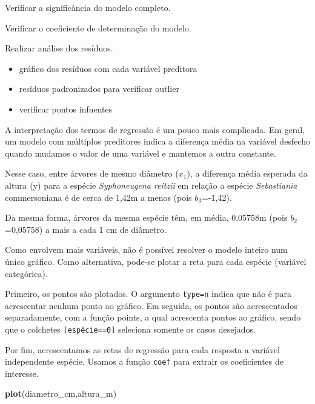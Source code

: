 \documentclass[12pt,brazil,]{book}
\newenvironment{Shaded}{\begin{snugshade}}{\end{snugshade}}
\newcommand{\KeywordTok}[1]{\textcolor[rgb]{0.13,0.29,0.53}{\textbf{#1}}}
\newcommand{\NormalTok}[1]{#1}
\providecommand{\tightlist}{%
  \setlength{\itemsep}{0pt}\setlength{\parskip}{0pt}}
\begin{document}
Verificar a significância do modelo completo.

Verificar o coeficiente de determinação do modelo.

Realizar análise dos resíduos.

\begin{itemize}
\tightlist
\item
  gráfico dos resíduos com cada variável preditora
\item
  resíduos padronizados para verificar outlier
\item
  verificar pontos infuentes
\end{itemize}

A interpretação dos termos de regressão é um pouco mais complicada. Em
geral, um modelo com múltiplos preditores indica a diferença média na
variável desfecho quando mudamos o valor de uma variável e mantemos a
outra constante.

Nesse caso, entre árvores de mesmo diâmetro (\(x_1\)), a diferença média
esperada da altura (y) para a espécie \emph{Syphoneugena reitzii} em
relação a espécie \emph{Sebastiania} commersoniana é de cerca de 1,42m a
menos (pois \(b_3\)=-1,42).

Da mesma forma, árvores da mesma espécie têm, em média, 0,05758m (pois
\(b_2\)=0,05758) a mais a cada 1 cm de diâmetro.

Como envolvem mais variáveis, não é possível resolver o modelo inteiro
num único gráfico. Como alternativa, pode-se plotar a reta para cada
espécie (variável categórica).

Primeiro, os pontos são plotados. O argumento
\texttt{type=\textquotesingle{}n\textquotesingle{}} indica que não é
para acrescentar nenhum ponto ao gráfico. Em seguida, os pontos são
acrescentados separadamente, com a função points, a qual acrescenta
pontos ao gráfico, sendo que o colchetes \texttt{{[}espécie==0{]}}
seleciona somente os casos desejados.

Por fim, acrescentamos as retas de regressão para cada resposta a
variável independente espécie. Usamos a função \texttt{coef} para
extrair os coeficientes de interesse.

\begin{Shaded}
\begin{Highlighting}[]
\KeywordTok{plot}\NormalTok{(diametro_cm,altura_m)}
\end{Highlighting}
\end{Shaded}
\end{document}
